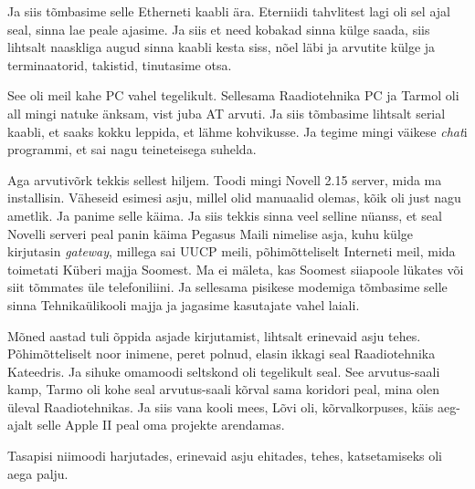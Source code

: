 Ja siis tõmbasime selle Etherneti kaabli ära. Eterniidi tahvlitest lagi oli sel 
ajal seal, sinna lae peale ajasime. Ja siis et need  kobakad sinna külge saada, 
siis lihtsalt naaskliga augud sinna kaabli  kesta siss, nõel läbi ja 
arvutite külge ja terminaatorid, takistid, tinutasime otsa. 


See oli meil kahe PC vahel tegelikult. Sellesama Raadiotehnika PC ja Tarmol oli 
all mingi natuke änksam, vist juba AT arvuti. Ja siis tõmbasime lihtsalt serial 
kaabli, et saaks kokku leppida, et lähme kohvikusse. Ja tegime mingi väikese 
\emph{chat}i programmi, et sai nagu teineteisega suhelda. 

Aga arvutivõrk tekkis sellest hiljem. Toodi mingi Novell 2.15 
server, mida ma installisin. Väheseid esimesi asju, millel olid manuaalid 
olemas, kõik oli just nagu ametlik. Ja panime selle käima. Ja siis tekkis sinna 
veel selline nüanss, et seal Novelli serveri peal panin käima Pegasus 
Maili nimelise asja, kuhu külge kirjutasin \emph{gateway}, 
millega sai UUCP meili, põhimõtteliselt Interneti meil, mida toimetati Küberi 
majja Soomest. Ma ei mäleta, kas Soomest siiapoole lükates või siit tõmmates 
üle telefoniliini. Ja sellesama pisikese modemiga tõmbasime selle sinna 
Tehnikaülikooli majja ja jagasime kasutajate vahel laiali.


Mõned aastad tuli õppida asjade kirjutamist, lihtsalt erinevaid asju tehes. 
Põhimõtteliselt noor inimene, peret polnud, elasin ikkagi seal Raadiotehnika 
Kateedris. Ja sihuke omamoodi seltskond oli tegelikult seal. See arvutus-saali 
kamp, Tarmo oli kohe seal arvutus-saali kõrval sama 
koridori peal, mina olen üleval Raadiotehnikas. Ja siis vana kooli mees, 
Lõvi oli, kõrvalkorpuses, käis aeg-ajalt selle Apple II peal 
oma  projekte arendamas.

Tasapisi niimoodi harjutades, erinevaid asju ehitades, tehes,  katsetamiseks 
oli aega palju.


